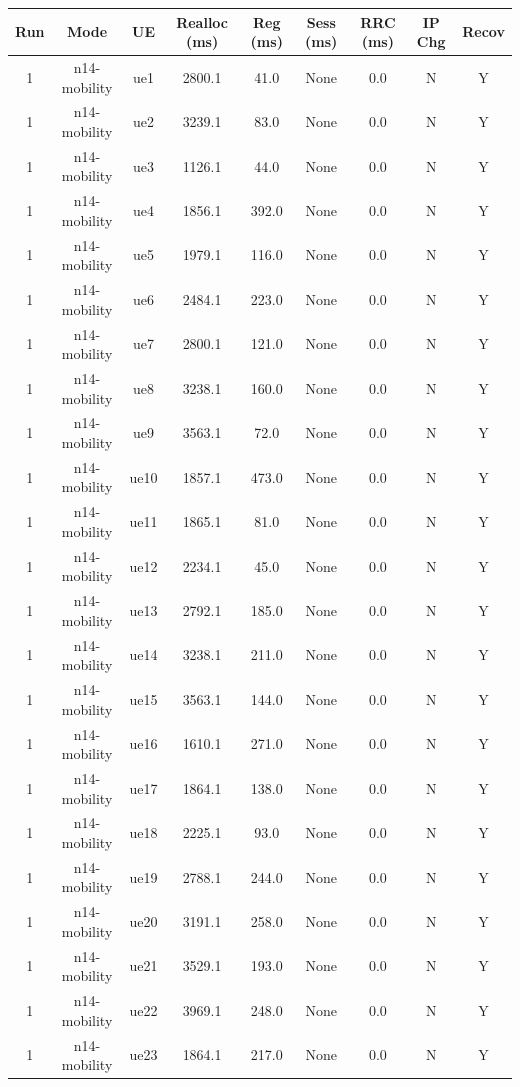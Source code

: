 \begin{table}[ht]
\centering
\begin{tabular}{|c|c|c|c|c|c|c|c|c|}
\hline
Run & Mode & UE & Realloc (ms) & Reg (ms) & Sess (ms) & RRC (ms) & IP Chg & Recov \\
\hline
1 & n14-mobility & ue1 & 2800.1 & 41.0 & None & 0.0 & N & Y \\
1 & n14-mobility & ue2 & 3239.1 & 83.0 & None & 0.0 & N & Y \\
1 & n14-mobility & ue3 & 1126.1 & 44.0 & None & 0.0 & N & Y \\
1 & n14-mobility & ue4 & 1856.1 & 392.0 & None & 0.0 & N & Y \\
1 & n14-mobility & ue5 & 1979.1 & 116.0 & None & 0.0 & N & Y \\
1 & n14-mobility & ue6 & 2484.1 & 223.0 & None & 0.0 & N & Y \\
1 & n14-mobility & ue7 & 2800.1 & 121.0 & None & 0.0 & N & Y \\
1 & n14-mobility & ue8 & 3238.1 & 160.0 & None & 0.0 & N & Y \\
1 & n14-mobility & ue9 & 3563.1 & 72.0 & None & 0.0 & N & Y \\
1 & n14-mobility & ue10 & 1857.1 & 473.0 & None & 0.0 & N & Y \\
1 & n14-mobility & ue11 & 1865.1 & 81.0 & None & 0.0 & N & Y \\
1 & n14-mobility & ue12 & 2234.1 & 45.0 & None & 0.0 & N & Y \\
1 & n14-mobility & ue13 & 2792.1 & 185.0 & None & 0.0 & N & Y \\
1 & n14-mobility & ue14 & 3238.1 & 211.0 & None & 0.0 & N & Y \\
1 & n14-mobility & ue15 & 3563.1 & 144.0 & None & 0.0 & N & Y \\
1 & n14-mobility & ue16 & 1610.1 & 271.0 & None & 0.0 & N & Y \\
1 & n14-mobility & ue17 & 1864.1 & 138.0 & None & 0.0 & N & Y \\
1 & n14-mobility & ue18 & 2225.1 & 93.0 & None & 0.0 & N & Y \\
1 & n14-mobility & ue19 & 2788.1 & 244.0 & None & 0.0 & N & Y \\
1 & n14-mobility & ue20 & 3191.1 & 258.0 & None & 0.0 & N & Y \\
1 & n14-mobility & ue21 & 3529.1 & 193.0 & None & 0.0 & N & Y \\
1 & n14-mobility & ue22 & 3969.1 & 248.0 & None & 0.0 & N & Y \\
1 & n14-mobility & ue23 & 1864.1 & 217.0 & None & 0.0 & N & Y \\

\end{tabular}
\end{table}
